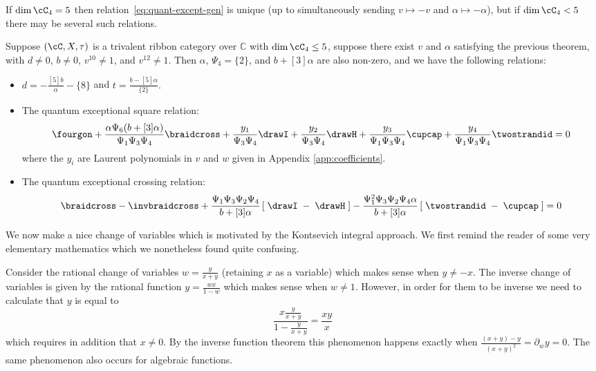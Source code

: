\documentclass[12pt]{amsart}
\begin{document}
If $\dim{\cC_4} = 5$ then relation~\eqref{eq:quant-except-gen} is
unique (up to simultaneously sending $v \mapsto -v$ and $\alpha \mapsto -\alpha$),
but if $\dim{\cC_4} < 5$ there may be several such relations.

\begin{theorem}\label{thm:square-crossing}
Suppose $(\cC, X, \tau)$ is a trivalent ribbon category over $\mathbb{C}$ with
$\dim{\cC_4} \leq 5$, suppose there exist $v$ and $\alpha$ satisfying the
previous theorem, with $d \neq 0 $, $b \neq 0$, $v^{10} \neq 1$, and $v^{12}
\neq 1$.  Then $\alpha$, $\Psi_4 = \{2\}$, and $b+[3]\alpha$ are
also non-zero, and we have the following relations:
\begin{itemize}
\item
$
  d = -\frac{[5] b}{\alpha} - \{8\} 
$
and
$
  t = \frac{b-[5] \alpha}{\{2\}}.
$
\item

The quantum exceptional square relation:
\begin{equation*} \fourgon + \frac{\alpha \Psi_6 (b+[3]\alpha)}{\Psi_1 \Psi_3 \Psi_4}  \braidcross + \frac{y_1}{\Psi_3 \Psi_4}  \drawI + \frac{y_2}{\Psi_3 \Psi_4}  \drawH + \frac{y_3}{\Psi_1 \Psi_3 \Psi_4} \cupcap + \frac{y_4}{\Psi_1 \Psi_3 \Psi_4} \twostrandid =0
\end{equation*}
where the $y_i$ are Laurent polynomials in $v$ and $w$ given in Appendix \ref{app:coefficients}.
\item
The quantum exceptional crossing relation:
\begin{equation*}
\braidcross - \invbraidcross + \frac{\Psi_1 \Psi_3 \Psi_2 \Psi_4}{b+[3]\alpha} \left[\; \drawI \; - \; \drawH \; \right] - \frac{\Psi_1^2 \Psi_3 \Psi_2 \Psi_4 \alpha}{b+[3]\alpha} \left[\; \twostrandid \; - \; \cupcap \; \right] = 0
\end{equation*}
\end{itemize}

\end{theorem}

We now make a nice change of variables which is motivated by the Kontsevich integral approach.  We first remind the reader of some very elementary mathematics which we nonetheless found quite confusing.

\begin{remark}
Consider the rational change of variables $w= \frac{y}{x+y}$ (retaining $x$ as a variable) which makes sense when $y \neq -x$.  The inverse change of variables is given by the rational function $y = \frac{wx}{1-w}$ which makes sense when $w \neq 1$.  However, in order for them to be inverse we need to calculate that $y$ is equal to
$$\frac{x\frac{y}{x+y}}{1-\frac{y}{x+y}} = \frac{xy}{x}$$ which requires in addition that $x \neq 0$.  By the inverse function theorem this phenomenon happens exactly when $\frac{(x+y)-y}{(x+y)^2} = \partial_w y = 0$.  The same phenomenon also occurs for algebraic functions.
\end{remark}
\end{document}
